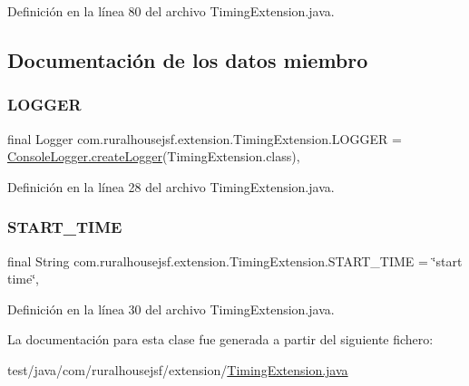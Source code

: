 Definición en la línea 80 del archivo Timing\+Extension.\+java.



\subsection{Documentación de los datos miembro}
\mbox{\label{classcom_1_1ruralhousejsf_1_1extension_1_1_timing_extension_a6c2790b974e4ae4484a4ad0f67ead486}} 
\subsubsection{\texorpdfstring{LOGGER}{LOGGER}}
{\footnotesize\ttfamily final Logger com.\+ruralhousejsf.\+extension.\+Timing\+Extension.\+L\+O\+G\+G\+ER = \mbox{\hyperlink{classcom_1_1ruralhousejsf_1_1logger_1_1_console_logger_a520321643663e37d95761134a35505cd}{Console\+Logger.\+create\+Logger}}(Timing\+Extension.\+class)\hspace{0.3cm}{\ttfamily [static]}, {\ttfamily [private]}}



Definición en la línea 28 del archivo Timing\+Extension.\+java.

\mbox{\label{classcom_1_1ruralhousejsf_1_1extension_1_1_timing_extension_ad283289939c7b6e42277a8b06db6a765}} 
\subsubsection{\texorpdfstring{START\_TIME}{START\_TIME}}
{\footnotesize\ttfamily final String com.\+ruralhousejsf.\+extension.\+Timing\+Extension.\+S\+T\+A\+R\+T\+\_\+\+T\+I\+ME = \char`\"{}start time\char`\"{}\hspace{0.3cm}{\ttfamily [static]}, {\ttfamily [private]}}



Definición en la línea 30 del archivo Timing\+Extension.\+java.



La documentación para esta clase fue generada a partir del siguiente fichero\+:\begin{DoxyCompactItemize}
\item 
test/java/com/ruralhousejsf/extension/\mbox{\hyperlink{_timing_extension_8java}{Timing\+Extension.\+java}}\end{DoxyCompactItemize}
